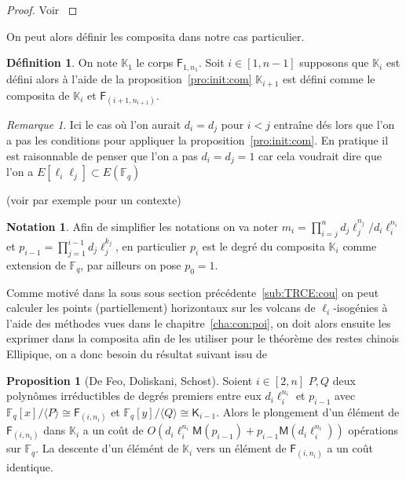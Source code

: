 \documentclass[10pt,a4paper]{book}
\theoremstyle{plain}
\theoremstyle{definition}
\theoremstyle{definition}
\theoremstyle{definition}
\newtheorem{prop}[thm]{Proposition}
\theoremstyle{definition}
\newtheorem{defi}[thm]{Définition}
\theoremstyle{remark}
\newtheorem{rem}[thm]{Remarque}
\theoremstyle{remark}
\theoremstyle{definition}
\newtheorem{nota}[thm]{Notation}
\begin{document}
\begin{proof}
Voir \cite[Theorem 2]{BrawleyCarlitz87}
\end{proof}

On peut alors définir les composita dans notre cas particulier.
\begin{defi}
\label{def:con:com}
On note $\mathbb{K}_1$ le corps $\mathsf{F}_{1,n_1}$. Soit $i \in [1,n-1]$ 
supposons que $\mathbb{K}_{i}$ est défini alors à 
l'aide de la proposition~\ref{pro:init:com} $\mathbb{K}_{i+1}$ est défini comme
 le composita de $\mathbb{K}_i$ et $\mathsf{F}_{(i+1,n_{i+1})}$.
\end{defi}
\begin{rem}
Ici le cas où l'on aurait $d_i=d_j$ pour $i<j$ entraîne dés lors que l'on a pas
les conditions pour appliquer la proposition~\ref{pro:init:com}.  
En pratique il est raisonnable de penser que l'on a pas $d_i=d_j=1$ car cela 
voudrait dire que l'on a $E[\ell_i \ell_j] \subset E(\mathbb{F}_q)$ 
\end{rem}

(voir par exemple 
\cite{Schost15} pour un contexte) 
\begin{nota} Afin de simplifier les notations on va 
 noter $m_i=\prod_{i=j}^nd_j\ell_j^{n_j}/d_i\ell_i^{n_i}$ et 
 $p_{i-1}=\prod_{j=1}^{i-1}d_j\ell_j^{k_j}$, en particulier $p_{i}$ est le 
 degré du composita $\mathbb{K}_i$ comme extension de $\mathbb{F}_q$, par 
 ailleurs on pose $p_0=1$.
\end{nota}

 Comme motivé dans la sous sous section précédente~\ref{sub:TRCE:cou} on peut 
 calculer les points (partiellement) horizontaux sur les volcans de 
 $\ell_i$-isogénies à l'aide des méthodes vues dans le 
 chapitre~\ref{cha:con:poi}, on doit alors ensuite les exprimer dans la 
 composita afin de les utiliser pour le théorème des restes chinois Ellipique,
 on a donc besoin du résultat suivant issu de \cite[Theorem 1]{DeFeoDoliskaniSchost14}
 \begin{prop}[De Feo, Doliskani, Schost]
 \label{pro:com:inj}
 Soient $i \in [2,n] $ $P,Q$ deux polynômes irréductibles de degrés premiers 
  entre eux $d_i\ell_i^{n_i}$ et $p_{i-1}$ avec
   $\mathbb{F}_q[x]/\langle P \rangle \cong \mathsf{F}_{(i,n_i)}$ et 
   $\mathbb{F}_q[y]/\langle Q \rangle \cong \mathsf{K}_{i-1}$. Alors le 
   plongement d'un élément de $\mathsf{F}_{(i,n_i)} $  dans $\mathbb{K}_{i}$ a un
   coût de 
   $O(d_i\ell_i^{n_i}\mathsf{M}(p_{i-1})+p_{i-1}\mathsf{M}(d_i\ell_i^{n_i}))$ 
   opérations sur $\mathbb{F}_q$. La descente d'un élémént de $\mathbb{K}_{i} $
   vers un élément de $\mathsf{F}_{(i,n_i)}$  a un coût identique. 
 \end{prop}
\end{document}
